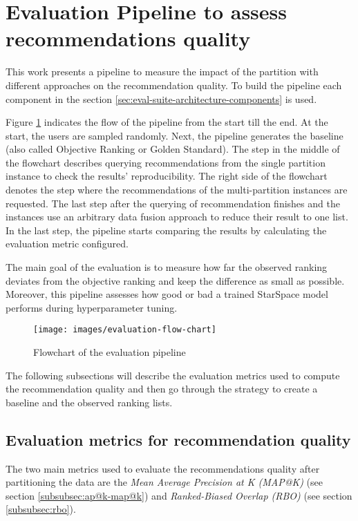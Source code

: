 \section{Evaluation Pipeline to assess recommendations quality}
\label{sec:evaluation-pipeline}
This work presents a pipeline to measure the impact of the partition with different approaches on the recommendation quality. To build the pipeline each component in the section \ref{sec:eval-suite-architecture-components} is used. 

Figure \ref{fig:flowchart-evaluation-pipeline} indicates the flow of the pipeline from the start till the end. At the start, the users are sampled randomly. Next, the pipeline generates the baseline (also called Objective Ranking or Golden Standard). The step in the middle of the flowchart describes querying recommendations from the single partition instance to check the results' reproducibility. The right side of the flowchart denotes the step where the recommendations of the multi-partition instances are requested. The last step after the querying of recommendation finishes and the instances use an arbitrary data fusion approach to reduce their result to one list. In the last step, the pipeline starts comparing the results by calculating the evaluation metric configured. 

The main goal of the evaluation is to measure how far the observed ranking deviates from the objective ranking and keep the difference as small as possible. Moreover, this pipeline assesses how good or bad a trained StarSpace model performs during hyperparameter tuning.

\begin{figure}[!h]
    \centering
    \texttt{[image: images/evaluation-flow-chart]}
    \caption{Flowchart of the evaluation pipeline}
    \label{fig:flowchart-evaluation-pipeline}
\end{figure}


The following subsections will describe the evaluation metrics used to compute the recommendation quality and then go through the strategy to create a baseline and the observed ranking lists.

\subsection{Evaluation metrics for recommendation quality}
\label{subsec:evaluation-metrics-for-recommendation-quality}
The two main metrics used to evaluate the recommendations quality after partitioning the data are the \emph{Mean Average Precision at K (MAP@K)} (see section \ref{subsubsec:ap@k-map@k})  and \emph{Ranked-Biased Overlap (RBO)} (see section \ref{subsubsec:rbo}). 


